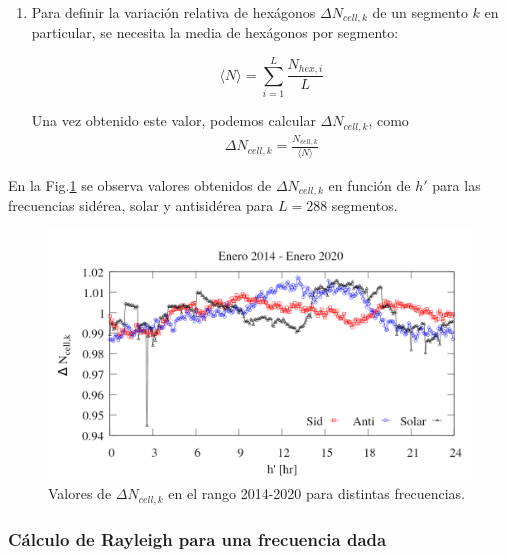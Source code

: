 \begin{enumerate}
        \item Para definir la variación relativa de hexágonos  $\Delta N_{cell,k}$ de un segmento $k$ en particular, se necesita la media de hexágonos por segmento:
       
       \begin{equation}
         \langle N \rangle = \sum^{L}_{i=1} \frac{N_{hex, i}}{L}
         \label{epepe}
       \end{equation}
       
       Una vez obtenido este valor, podemos calcular  $\Delta N_{cell,k}$, como 
      \begin{align}
         \Delta N_{cell,k} = \frac{N_{cell, k}}{\langle N \rangle}
      \end{align} 
      \end{enumerate}

      En la Fig.\ref{fig:pesos_ejemplo} se observa valores obtenidos de $\Delta N_{cell,k}$ en función de $h'$ para las frecuencias sidérea, solar y antisidérea para $L=288$ segmentos.

        \begin{figure}[H]
          \centering
              \includegraphics[width=0.85\linewidth]{weigths_2020.png}
              \caption{Valores de $\Delta N_{cell, k}$ en el rango 2014-2020 para distintas frecuencias.}
              \label{fig:pesos_ejemplo}
        \end{figure}



  \subsubsection{Cálculo de Rayleigh para una frecuencia dada} \label{rayleigh}

